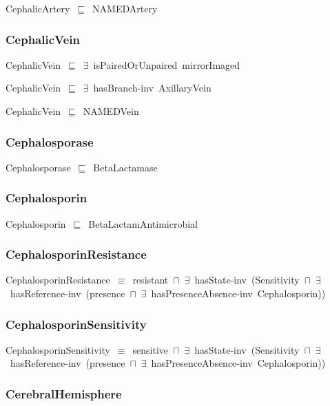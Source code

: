 \documentclass{article}
\begin{document}
CephalicArtery~\ensuremath{\sqsubseteq}~NAMEDArtery~

\subsubsection*{CephalicVein}

CephalicVein~\ensuremath{\sqsubseteq}~\ensuremath{\exists}~isPairedOrUnpaired~mirrorImaged~

CephalicVein~\ensuremath{\sqsubseteq}~\ensuremath{\exists}~hasBranch-inv~AxillaryVein~

CephalicVein~\ensuremath{\sqsubseteq}~NAMEDVein~

\subsubsection*{Cephalosporase}

Cephalosporase~\ensuremath{\sqsubseteq}~BetaLactamase~

\subsubsection*{Cephalosporin}

Cephalosporin~\ensuremath{\sqsubseteq}~BetaLactamAntimicrobial~

\subsubsection*{CephalosporinResistance}

CephalosporinResistance~\ensuremath{\equiv}~resistant~\ensuremath{\sqcap}~\ensuremath{\exists}~hasState-inv~(Sensitivity~\ensuremath{\sqcap}~\ensuremath{\exists}~hasReference-inv~(presence~\ensuremath{\sqcap}~\ensuremath{\exists}~hasPresenceAbsence-inv~Cephalosporin))

\subsubsection*{CephalosporinSensitivity}

CephalosporinSensitivity~\ensuremath{\equiv}~sensitive~\ensuremath{\sqcap}~\ensuremath{\exists}~hasState-inv~(Sensitivity~\ensuremath{\sqcap}~\ensuremath{\exists}~hasReference-inv~(presence~\ensuremath{\sqcap}~\ensuremath{\exists}~hasPresenceAbsence-inv~Cephalosporin))

\subsubsection*{CerebralHemisphere}
\end{document}
